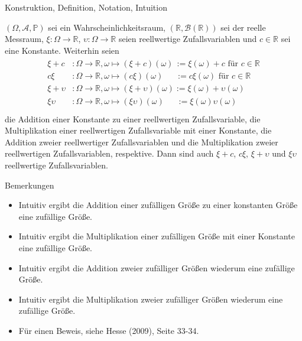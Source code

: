 \documentclass[
  8pt,
  ignorenonframetext,
]{beamer}
\providecommand{\tightlist}{%
  \setlength{\itemsep}{0pt}\setlength{\parskip}{0pt}}
\newcommand{\ups}{\upsilon}
\begin{document}
\begin{frame}{Konstruktion, Definition, Notation, Intuition}
\protect\hypertarget{konstruktion-definition-notation-intuition-8}{}
\footnotesize
\begin{theorem}
\justifying
\normalfont
$(\Omega, \mathcal{A}, \mathbb{P})$ sei ein Wahrscheinlichkeitsraum, 
$(\mathbb{R}, \mathcal{B}(\mathbb{R}))$ sei der reelle Messraum, 
$\xi : \Omega \to \mathbb{R}$, $\ups : \Omega \to  \mathbb{R}$ seien reellwertige 
Zufallsvariablen und $c \in \mathbb{R}$ sei eine Konstante. Weiterhin seien
\begin{align}
\begin{split}
\xi + c    & : \Omega \to \mathbb{R}, \omega \mapsto (\xi + c)(\omega)\,           := \xi(\omega) + c              \mbox{ für } c \in \mathbb{R}   \\
c\xi       & : \Omega \to \mathbb{R}, \omega \mapsto (c\xi)(\omega) \quad\,\,\,    := c\xi(\omega)                 \mbox{ für } c \in \mathbb{R}   \\
\xi + \ups & : \Omega \to \mathbb{R}, \omega \mapsto (\xi + \ups)(\omega)          := \xi(\omega) + \ups(\omega)                                   \\
\xi\ups    & : \Omega \to \mathbb{R}, \omega \mapsto (\xi\ups)(\omega)\quad\,\,\,  := \xi(\omega)\ups(\omega)                                      \\
\end{split}
\end{align}
die Addition einer Konstante zu einer reellwertigen Zufallsvariable, die Multiplikation einer
reellwertigen  Zufallsvariable mit einer Konstante, die Addition zweier reellwertiger Zufallsvariablen und die
Multiplikation zweier reellwertigen Zufallsvariablen, respektive. Dann sind auch $\xi + c$, $c\xi$,
$\xi + \ups$ und $\xi\ups$ reellwertige Zufallsvariablen.
\end{theorem}

Bemerkungen

\begin{itemize}
\tightlist
\item
  Intuitiv ergibt die Addition einer zufälligen Größe zu einer
  konstanten Größe eine zufällige Größe.
\item
  Intuitiv ergibt die Multiplikation einer zufälligen Größe mit einer
  Konstante eine zufällige Größe.
\item
  Intuitiv ergibt die Addition zweier zufälliger Größen wiederum eine
  zufällige Größe.
\item
  Intuitiv ergibt die Multiplikation zweier zufälliger Größen wiederum
  eine zufällige Größe.
\item
  Für einen Beweis, siehe Hesse (2009), Seite 33-34.
\end{itemize}
\end{frame}
\end{document}
